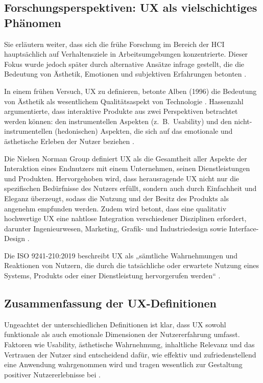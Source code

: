\documentclass[12pt,oneside]{article}
\begin{document}
\subsection{Forschungsperspektiven: UX als vielschichtiges Phänomen}

Sie erläutern weiter, dass sich die frühe Forschung im Bereich der HCI hauptsächlich auf Verhaltensziele in Arbeitsumgebungen konzentrierte. Dieser Fokus wurde jedoch später durch alternative Ansätze infrage gestellt, die die Bedeutung von Ästhetik, Emotionen und subjektiven Erfahrungen betonten \cite{research}.

In einem frühen Versuch, UX zu definieren, betonte Alben (1996) die Bedeutung von Ästhetik als wesentlichem Qualitätsaspekt von Technologie \cite{research}. Hassenzahl argumentierte, dass interaktive Produkte aus zwei Perspektiven betrachtet werden können: den instrumentellen Aspekten (z.~B.\ Usability)
 und den nicht-instrumentellen (hedonischen) Aspekten, die sich auf das emotionale und ästhetische Erleben der Nutzer beziehen \cite{hassenzahl2003}.

Die Nielsen Norman Group definiert UX als die Gesamtheit aller Aspekte der Interaktion eines Endnutzers mit einem Unternehmen, seinen Dienstleistungen und Produkten. Hervorgehoben wird, dass herausragende UX nicht nur die spezifischen Bedürfnisse des Nutzers erfüllt, sondern auch durch Einfachheit und Eleganz überzeugt, sodass die Nutzung und der Besitz des Produkts als angenehm empfunden werden. Zudem wird betont, dass eine qualitativ hochwertige UX eine nahtlose Integration verschiedener Disziplinen erfordert, darunter Ingenieurwesen, Marketing, Grafik- und Industriedesign sowie Interface-Design \cite{nngroup}.

Die ISO 9241-210:2019 beschreibt UX als „sämtliche Wahrnehmungen und Reaktionen von Nutzern, die durch die tatsächliche oder erwartete Nutzung eines Systems, Produkts oder einer Dienstleistung hervorgerufen werden“ \cite{ISO}.

\subsection{Zusammenfassung der UX-Definitionen}

Ungeachtet der unterschiedlichen Definitionen ist klar, dass UX sowohl funktionale als auch emotionale Dimensionen der Nutzererfahrung umfasst. Faktoren wie Usability, ästhetische Wahrnehmung, inhaltliche Relevanz und das Vertrauen der Nutzer sind entscheidend dafür, wie effektiv und zufriedenstellend eine Anwendung wahrgenommen wird und tragen wesentlich zur Gestaltung positiver Nutzererlebnisse bei \cite{toolbox}.
\end{document}
